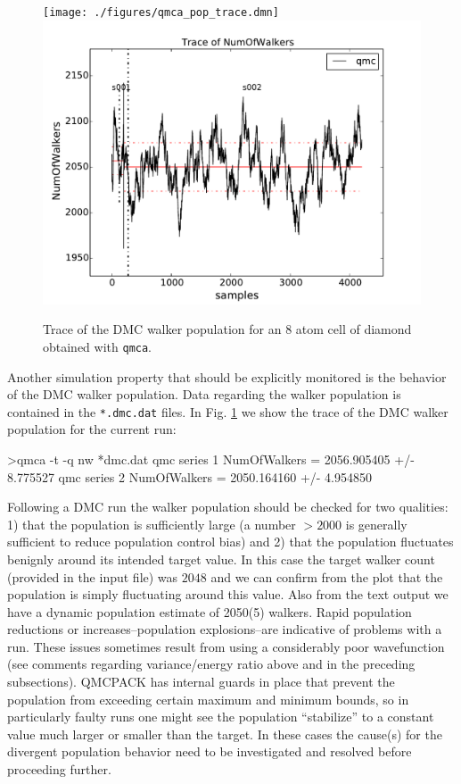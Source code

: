 \begin{figure}
\begin{center}
  \ifdefined\HCode
\texttt{[image: ./figures/qmca\_pop\_trace.dmn]}
\else
\includegraphics[trim = 0mm 0mm 0mm 0mm, clip,width=0.75\columnwidth]{./figures/qmca_pop_trace.pdf}
\fi
\end{center}
\caption{Trace of the DMC walker population for an 8 atom cell of diamond obtained with \texttt{qmca}.}
\label{fig:qmca_pop_trace}
\end{figure}

Another simulation property that should be explicitly monitored  
is the behavior of the DMC walker population.  Data regarding the 
walker population is contained in the \texttt{*.dmc.dat} files.
In Fig. \ref{fig:qmca_pop_trace} we show the trace of the DMC 
walker population for the current run:
\begin{shade}
>qmca -t -q nw *dmc.dat
qmc  series 1  NumOfWalkers          =  2056.905405 +/- 8.775527 
qmc  series 2  NumOfWalkers          =  2050.164160 +/- 4.954850 
\end{shade}
\noindent
Following a DMC run the walker population should be checked for 
two qualities: 1) that the population is sufficiently large (a number 
$>2000$ is generally sufficient to reduce population control bias) and  
2) that the population fluctuates benignly around its intended target 
value. In this case the target walker count (provided in the input file)
was $2048$ and we can confirm from the plot that the population is simply 
fluctuating around this value.  Also from the text output we have a dynamic 
population estimate of 2050(5) walkers.  Rapid population reductions or 
increases--population explosions--are indicative of problems with a run.  
These issues sometimes result from using a considerably poor wavefunction 
(see comments regarding variance/energy ratio above and in the preceding 
subsections).  QMCPACK has internal guards in place that prevent 
the population from exceeding certain maximum and minimum bounds, so 
in particularly faulty runs one might see the population ``stabilize'' 
to a constant value much larger or smaller than the target.  In these 
cases the cause(s) for the divergent population behavior need to 
be investigated and resolved before proceeding further.



